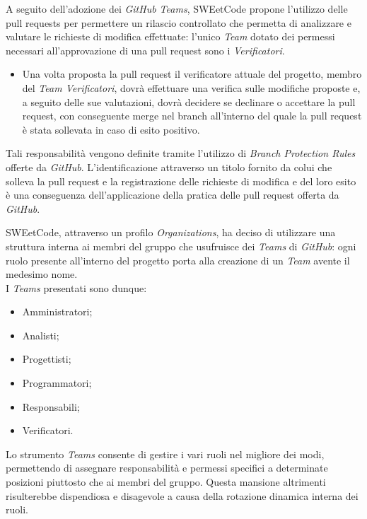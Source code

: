 \documentclass[10pt, a4paper]{article}
\begin{document}
\label{sec:pull_request}
A seguito dell'adozione dei \textit{GitHub Teams}, SWEetCode propone l'utilizzo delle pull requests per permettere un rilascio controllato che permetta di analizzare 
e valutare le richieste di modifica effettuate: l'unico \textit{Team} dotato dei permessi necessari all'approvazione di una pull request sono i \textit{Verificatori}.
\begin{itemize}
    \item Una volta proposta la pull request il verificatore attuale del progetto, membro del \textit{Team Verificatori}, dovrà effettuare una verifica sulle modifiche proposte e,
a seguito delle sue valutazioni, dovrà decidere se declinare o accettare la pull request, con conseguente merge nel branch all'interno del quale la pull request è stata 
sollevata in caso di esito positivo.
\end{itemize}

Tali responsabilità vengono definite tramite l'utilizzo di \textit{Branch Protection Rules} offerte da \textit{GitHub}.
L'identificazione attraverso un titolo fornito da colui che solleva la pull request e la registrazione delle richieste di modifica e del loro esito è una conseguenza
dell'applicazione della pratica delle pull request offerta da \textit{GitHub}.

SWEetCode, attraverso un profilo \textit{Organizations}, ha deciso di utilizzare una struttura interna ai membri del gruppo che usufruisce dei \textit{Teams} di 
\textit{GitHub}: ogni ruolo presente all'interno del progetto porta alla creazione di un \textit{Team} avente il medesimo nome.\\
I \textit{Teams} presentati sono dunque:
\begin{itemize}
    \item Amministratori;
    \item Analisti;
    \item Progettisti;
    \item Programmatori;
    \item Responsabili;
    \item Verificatori.
\end{itemize}
Lo strumento \textit{Teams} consente di gestire i vari ruoli nel migliore dei modi, permettendo di assegnare responsabilità e permessi specifici a determinate posizioni 
piuttosto che ai membri del gruppo. Questa mansione altrimenti risulterebbe dispendiosa e disagevole a causa della rotazione dinamica interna dei ruoli. 
\end{document}
